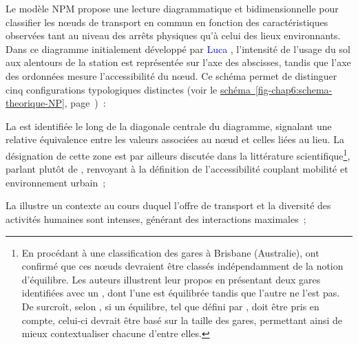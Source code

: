 \begin{refsegment}
Le modèle \acrshort{NPM} propose une lecture diagrammatique et bidimensionnelle pour classifier les nœuds de transport en commun en fonction des caractéristiques observées tant au niveau des arrêts physiques qu'à celui des lieux environnants. Dans ce diagramme initialement développé par \textcolor{blue}{Luca} \textcolor{blue}{\textcite[344]{bertolini_nodes_1996}}, l'intensité de l'usage du sol aux alentours de la station est représentée sur l'axe des abscisses, tandis que l'axe des ordonnées mesure l'accessibilité du nœud. Ce schéma permet de distinguer cinq configurations typologiques distinctes (voir le \hyperref[fig-chap6:schema-theorique-NP]{schéma~\ref{fig-chap6:schema-theorique-NP}}, page~\pageref{fig-chap6:schema-theorique-NP})~:
\begin{customitemize}
    \item La  est identifiée le long de la diagonale centrale du diagramme, signalant une relative équivalence entre les valeurs associées au nœud et celles liées au lieu. La désignation de cette zone est par ailleurs discutée dans la littérature scientifique\footnote{
        En procédant à une classification des gares à Brisbane (Australie), \textcolor{blue}{\textcite[55]{kamruzzaman_advance_2014}} ont confirmé que ces nœuds devraient être classés indépendamment de la notion d'équilibre. Les auteurs illustrent leur propos en présentant deux gares identifiées avec un , dont l'une est équilibrée tandis que l'autre ne l'est pas. De surcroît, selon \textcolor{blue}{\textcite[194]{reusser_classifying_2008}}, si un équilibre, tel que défini par \textcolor{blue}{\textcite[202]{bertolini_spatial_1999}}, doit être pris en compte, celui-ci devrait être basé sur la taille des gares, permettant ainsi de mieux contextualiser chacune d'entre elles.
    }, \textcolor{blue}{\textcite[243]{yang_tod_2021}} parlant plutôt de , renvoyant à la définition de l'accessibilité couplant mobilité et environnement urbain~;
    \item La  illustre un contexte au cours duquel l'offre de transport et la diversité des activités humaines sont intenses, générant des interactions maximales~;

\end{customitemize}
\end{refsegment}
